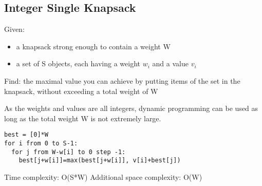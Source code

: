 \subsection{Integer Single Knapsack}
Given:
\begin{itemize}
\item{a knapsack strong enough to contain a weight W}
\item{a set of S objects, each having a weight $w_i$ and a value $v_i$}
\end{itemize}
Find: the maximal value you can achieve by putting items of the set in the knapsack, without exceeding a total weight of W

As the weights and values are all integers, dynamic programming can be used as long as the total weight W is not extremely large.
\begin{lstlisting}
best = [0]*W
for i from 0 to S-1:
  for j from W-w[i] to 0 step -1:
    best[j+w[i]]=max(best[j+w[i]], v[i]+best[j])
\end{lstlisting}
Time complexity: O(S*W)
Additional space complexity: O(W)

